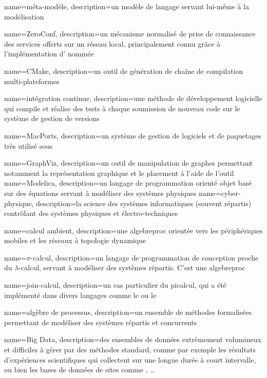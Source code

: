 {
	name={méta-modèle},
	description={un modèle de langage servant lui-même à la modélisation}	
}

{
	name={ZeroConf},
	description={un mécanisme normalisé de prise de connaissance des services offerts sur un réseau local, principalement connu grâce à l'implémentation d' nommée }	
}

{
	name={CMake}, 
	description={un outil de génération de chaîne de compilation multi-plateformes}
}

{
	name={intégration continue},
	description={une méthode de développement logicielle qui compile et réalise des tests à chaque soumission de nouveau code sur le système de gestion de versions}
}

{
	name=MacPorts, 
	description={un système de gestion de logiciels et de paquetages très utilisé sous }
}

{
	name=GraphViz, 
	description={un outil de manipulation de graphes permettant notamment la représentation graphique et le placement à l'aide de l'outil }
}
{
	name=Modelica, 
	description={un langage de programmation orienté objet basé sur des équations servant à modéliser des systèmes physiques}
}
{
	name=cyber-physique, 
	description={la science des systèmes informatiques (souvent répartis) contrôlant des systèmes physiques et électro-techniques}
}

{
	name={calcul ambient}, 
	description={une \gls{algebreproc} orientée vers les périphériques mobiles et les réseaux à topologie dynamique}
}

{
	name={$\pi$-calcul},
	description={un langage de programmation de conception proche du $\lambda$-calcul, servant à modéliser des systèmes répartis. C'est une \gls{algebreproc}}	
}

{
	name={join-calcul}, 
	description={un cas particulier du \gls{picalcul}, qui a été implémenté dans divers langages comme le  ou le }
}

{
	name={algèbre de processus},
	description={un ensemble de méthodes formalisées permettant de modéliser des systèmes répartis et concurrents}
}

{
	name={Big Data},
	description={des ensembles de données extrêmement volumineux et difficiles à gérer par des méthodes standard, comme par exemple les résultats d'expériences scientifiques qui collectent sur une longue durée à court intervalle, ou bien les bases de données de sites comme , \dots}
}


